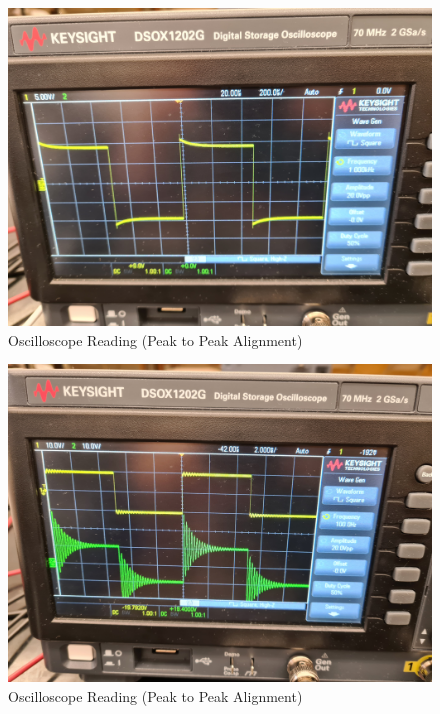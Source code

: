 \documentclass[a4paper,12pt]{article}
\begin{document}
\begin{figure}[H]
  \centering
  \includegraphics[width=1.0\linewidth]{../data/20211116_104820.jpg}
  \begin{center}
    \begin{center}   
    \end{center}  \end{center}
  \caption{Oscilloscope Reading (Peak to Peak Alignment)}
  \label{osc}
\end{figure}

\begin{figure}[H]
  \centering
  \includegraphics[width=1.0\linewidth]{../data/20211116_110612.jpg}
  \begin{center}
    \begin{center}   
    \end{center}  \end{center}
  \caption{Oscilloscope Reading (Peak to Peak Alignment)}
  \label{osc}
\end{figure}
\end{document}
